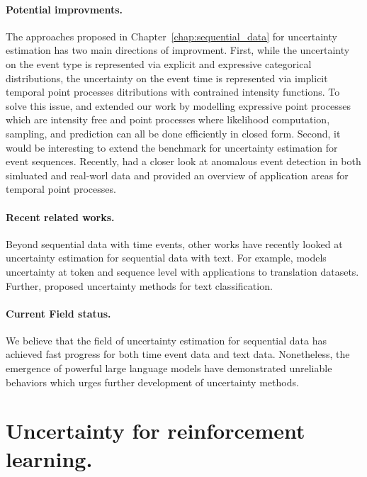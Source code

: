 \paragraph{Potential improvments.} The approaches proposed in Chapter~\ref{chap:sequential_data} for uncertainty estimation has two main directions of improvment. First, while the uncertainty on the event type is represented via explicit and expressive categorical distributions, the uncertainty on the event time is represented via implicit temporal point processes ditributions with contrained intensity functions. To solve this issue, \cite{shchur2020intensity} and \cite{shchur2020fast} extended our work by modelling expressive point processes which are intensity free and point processes where likelihood computation, sampling, and prediction can all be done efficiently in closed form. Second, it would be interesting to extend the benchmark for uncertainty estimation for event sequences. Recently, \cite{shchur2021detecting} had a closer look at anomalous event detection in both simluated and real-worl data and \cite{shchur2021review} provided an overview of application areas for temporal point processes. 

\paragraph{Recent related works.} Beyond sequential data with time events, other works have recently looked at uncertainty estimation for sequential data with text. For example, \cite{malinin2021uncertainty} models uncertainty at token and sequence level with applications to translation datasets. Further, \cite{he2020toward, hu2021uncertainty} proposed uncertainty methods for text classification.

\paragraph{Current Field status.} We believe that the field of uncertainty estimation for sequential data has achieved fast progress for both time event data and text data. Nonetheless, the emergence of powerful large language models have demonstrated unreliable behaviors which urges further development of uncertainty methods. 

\section{Uncertainty for reinforcement learning.}

